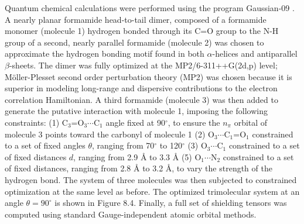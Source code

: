 \begin{doublespace}
Quantum chemical calculations were performed using the program Gaussian-09
\cite{gaussian2009}. A nearly planar formamide head-to-tail dimer,
composed of a formamide monomer (molecule 1) hydrogen bonded through its C=O
group to the N-H group of a second, nearly parallel formamide (molecule 2) was
chosen to approximate the hydrogen bonding motif found in both $\alpha$-helices
and antiparallel $\beta$-sheets. The dimer was fully optimized at the
MP2/6-311++G(2d,p) level; M\"{o}ller-Plesset second order perturbation theory
(MP2) was chosen because it is superior in modeling long-range and dispersive
contributions to the electron correlation Hamiltonian. A third formamide
(molecule 3) was then added to generate the putative \npistar{} interaction
with molecule 1, imposing the following constraints:
(1) C$_3$=O$_3\cdots$C$_1$ angle fixed at 90$^\circ$, to ensure the $n_\pi$
orbital of molecule 3 points toward the carbonyl of molecule
1 (2) O$_3\cdots$C$_1$=O$_1$ constrained to a set of fixed angles $\theta$,
ranging from 70$^\circ$ to 120$^\circ$ (3) O$_3\cdots$C$_1$ constrained to
a set of fixed distances $d$, ranging from 2.9 \r{A} to 3.3 \r{A}
(5) O$_1\cdots$N$_2$ constrained to a set of fixed distances, ranging
from 2.8 \r{A} to 3.2 \r{A}, to vary the strength of the hydrogen bond. The
system of three molecules was then subjected to constrained optimization at the
same level as before. The optimized trimolecular system at an angle
$\theta = 90^\circ$ is shown in Figure 8.4. Finally, a full set of shielding
tensors was computed using standard Gauge-independent atomic orbital methods.
\end{doublespace}


